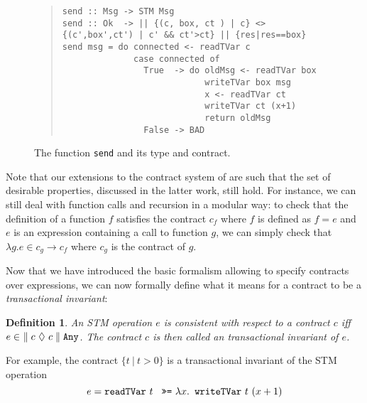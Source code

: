 \documentclass[submission,copyright,creativecommons]{eptcs}
\newcommand{\code}[1]{\textrm{{\tt #1}}}
\newcommand{\readTVarONLY}{\ensuremath{\code{readTVar}}}
\newcommand{\readTVar}[1]{\ensuremath{\readTVarONLY \ #1}}
\newcommand{\writeTVarONLY}{\ensuremath{\code{writeTVar}}}
\newcommand{\writeTVar}[2]{\ensuremath{\writeTVarONLY \ #1 \ #2}}
\newcommand{\bindTM}{\ \ensuremath{\code{>>=}} \ }
\newtheorem{definition}{Definition}
\begin{document}
\begin{figure}[htb]
  \centering
\begin{footnotesize}
\begin{quote}
\begin{verbatim}
send :: Msg -> STM Msg
send :: Ok  -> || {(c, box, ct ) | c} <> {(c',box',ct') | c' && ct'>ct} || {res|res==box} 
send msg = do connected <- readTVar c
              case connected of 
                True  -> do oldMsg <- readTVar box
                            writeTVar box msg
                            x <- readTVar ct
                            writeTVar ct (x+1)
                            return oldMsg
                False -> BAD
\end{verbatim}
\end{quote}
\end{footnotesize}  
  \caption{The function \texttt{send} and its type and contract.}
  \label{fig:ex:send}
\end{figure}

Note that our extensions to the contract system of \cite{static-contract-checking} are such that the set of desirable properties, discussed in the latter work, still hold. For instance, we can still deal with function calls and recursion in a modular way: to check that the definition of a function $f$ satisfies the contract $c_f$ where $f$ is defined as $f = e$ and $e$ is an expression containing a call to function $g$, we can simply check that $\lambda g . e \in c_g \rightarrow c_f$ where $c_g$ is the contract of $g$. 


Now that we have introduced the basic formalism allowing to specify contracts over expressions, we can now formally define what it means for a contract to be a \emph{transactional invariant}:
\begin{definition}
  An STM operation $e$ is \emph{consistent} with respect to a contract $c$ iff $e \in \ \contractTM{c}{c}{\mathtt{Any}}$. The contract $c$ is then called an \emph{transactional invariant} of $e$.
\end{definition}
For example, the contract $\{ t \ | \ t > 0 \}$  is a transactional invariant of the STM operation 
\[ e = \readTVar t \bindTM \lambda x. \writeTVar{t}{(x+1)} \]
\end{document}
